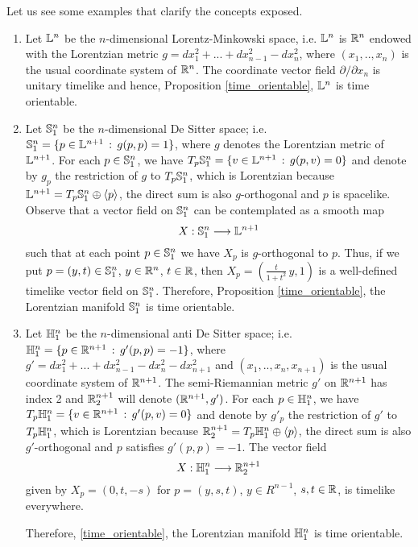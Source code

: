 \begin{example}
	Let us see some examples that clarify the concepts exposed.
	
	\begin{enumerate}
		\item Let $\L^n$ be the $n$-dimensional Lorentz-Minkowski space, i.e. $\L^n$ is $\R^n$ endowed with the Lorentzian metric $g=dx_1^2+...+dx_{n-1}^2-dx_n^2$, where $(x_1,..,x_n)$ is the usual coordinate system of $\R^n$. The coordinate vector field $\partial/\partial x_n$ is unitary timelike and hence, Proposition \ref{time_orientable}, $\L ^n$ is time orientable.
		\item Let $\S_1^n$ be the $n$-dimensional De Sitter space; i.e. $\S_1^n =\{p \in \L^{n+1} \, :\, g(p,p)=1 \}$, where $g$ denotes the Lorentzian metric of $\L^{n+1}$. For each $p \in \S_1^n$, we have $T_p\S_1^n=\{v \in \L^{n+1} \, : \, g(p,v)=0\}$
		and denote by $g_p$ the restriction of $g$ to $T_p\S_1^n$, which is Lorentzian because $\L^{n+1}=T_p\S_1^n \oplus \langle p \rangle$, the direct sum is also $g$-orthogonal and $p$ is spacelike. Observe that a vector field on $\S_1^n$ can be contemplated as a smooth map
		\[
		X : \S_1^n \longrightarrow \L^{n+1}
		\]
		such that at each point $p \in \S_1^n$ we have $X_p$ is $g$-orthogonal to $p$. Thus, if we put $p=(y,t)\in \S_1^n$, $y \in \R^n$, $t \in \R$, then $X_p=(\frac{t}{1+t^2}\,y,1)$ is a well-defined timelike vector field on $\S_1^n$. Therefore, Proposition \ref{time_orientable}, the Lorentzian manifold $\S_1^n$ is time orientable.
		\item Let $\H_1^n$ be the $n$-dimensional anti De Sitter space; i.e. $\H_1^n =\{p \in \R^{n+1} \, :\, g'(p,p)=-1 \}$, where $g'=dx_1^2+...+dx_{n-1}^2-dx_n^2-dx_{n+1}^2$ and $(x_1,..,x_n,x_{n+1})$ is the usual coordinate system of $\R^{n+1}$. The semi-Riemannian metric $g'$ on $\R^{n+1}$ has index 2 and $\R^{n+1}_2$ will denote $(\R^{n+1},g')$. For each $p \in \H_1^n$, we have $T_p\H_1^n=\{v \in \R^{n+1} \, : \, g'(p,v)=0\}$ and denote by $g'_p$ the restriction of $g'$ to $T_p\H_1^n$, which is Lorentzian because $\R^{n+1}_2=T_p\H_1^n \oplus \langle p \rangle$, the direct sum is also $g'$-orthogonal and $p$ satisfies $g'(p,p)=-1$. The vector field
		\[
		X : \H_1^n \longrightarrow \R^{n+1}_2
		\]
		given by $X_p=(0,t,-s)$ for $p=(y,s,t)$, $y \in R^{n-1}$, $s,t\in \R$, is timelike everywhere.
		
		Therefore, \autoref{time_orientable}, the Lorentzian manifold $\H_1^n$ is time orientable.
	\end{enumerate}
\end{example}

